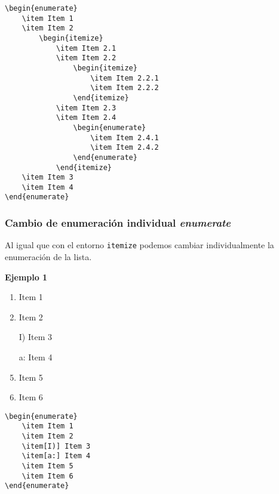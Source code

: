 	\begin{myquote}
		\begin{lstlisting}
\begin{enumerate}
	\item Item 1
	\item Item 2
		\begin{itemize}
			\item Item 2.1
			\item Item 2.2
				\begin{itemize}
					\item Item 2.2.1
					\item Item 2.2.2
				\end{itemize}
			\item Item 2.3
			\item Item 2.4
				\begin{enumerate}
					\item Item 2.4.1
					\item Item 2.4.2
				\end{enumerate}
			\end{itemize}
	\item Item 3
	\item Item 4
\end{enumerate}
		\end{lstlisting}
	\end{myquote}
	

	\subsubsection{Cambio de enumeración individual \textsl{enumerate}}	
	
	Al igual que con el entorno \verb|itemize| podemos cambiar individualmente la enumeración de la lista.
	
	\textbf{Ejemplo 1}
	
	\begin{enumerate}
		\item Item 1
		\item Item 2
		\item[I)] Item 3
		\item[a:] Item 4
		\item Item 5
		\item Item 6
	\end{enumerate}

	\begin{myquote}
		\begin{lstlisting}
\begin{enumerate}
	\item Item 1
	\item Item 2
	\item[I)] Item 3
	\item[a:] Item 4
	\item Item 5
	\item Item 6
\end{enumerate}
		\end{lstlisting}
	\end{myquote}
		
